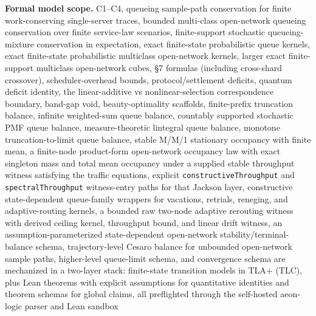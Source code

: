 \documentclass[
]{article}
\begin{document}
\textbf{Formal model scope.} C1--C4, queueing sample-path conservation
for finite work-conserving single-server traces, bounded multi-class
open-network queueing conservation over finite service-law scenarios,
finite-support stochastic queueing-mixture conservation in expectation,
exact finite-state probabilistic queue kernels, exact finite-state
probabilistic multiclass open-network kernels, larger exact
finite-support multiclass open-network cubes, §7 formulas (including
cross-shard crossover), scheduler-overhead bounds, protocol/settlement
deficits, quantum deficit identity, the linear-additive vs
nonlinear-selection correspondence boundary, band-gap void,
beauty-optimality scaffolds, finite-prefix truncation balance, infinite
weighted-sum queue balance, countably supported stochastic PMF queue
balance, measure-theoretic lintegral queue balance, monotone
truncation-to-limit queue balance, stable M/M/1 stationary occupancy
with finite mean, a finite-node product-form open-network occupancy law
with exact singleton mass and total mean occupancy under a supplied
stable throughput witness satisfying the traffic equations, explicit
\texttt{constructiveThroughput} and \texttt{spectralThroughput}
witness-entry paths for that Jackson layer, constructive state-dependent
queue-family wrappers for vacations, retrials, reneging, and
adaptive-routing kernels, a bounded raw two-node adaptive rerouting
witness with derived ceiling kernel, throughput bound, and linear drift
witness, an assumption-parameterized state-dependent open-network
stability/terminal-balance schema, trajectory-level Cesaro balance for
unbounded open-network sample paths, higher-level queue-limit schema,
and convergence schema are mechanized in a two-layer stack: finite-state
transition models in TLA+ (TLC), plus Lean theorems with explicit
assumptions for quantitative identities and theorem schemas for global
claims, all preflighted through the self-hosted aeon-logic parser and
Lean sandbox
\end{document}
